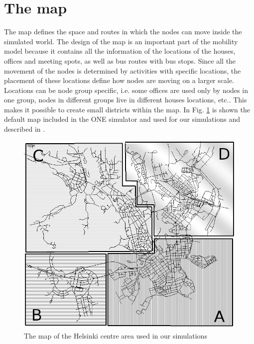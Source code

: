 \section{The map}
\label{mappaONE}
The map defines the space and routes in which the nodes can move inside the simulated world. The design of the map is an important part of the mobility model because it contains all the information of the locations of the houses, offices and meeting spots, as well as bus routes with bus stops. Since all the movement of the nodes is determined by activities with specific locations, the placement of these locations define how nodes are moving on a larger scale. Locations can be node group specific, i.e. some offices are used only by nodes in one group, nodes in different groups live in different houses locations, etc.. This makes it possible to create small districts within the map. In Fig. \ref{imgMappaABCD} is shown the default map included in the ONE simulator and used for our simulations and described in \cite{articoloWDM}.

\begin{figure}[htpb]
  \begin{center}
    \includegraphics[scale=0.6]{figure/mappa_ABCD.png}
    \caption[Helsinky map]{The map of the Helsinki centre area used in our simulations}    
    \label{imgMappaABCD}
  \end{center}
\end{figure}

